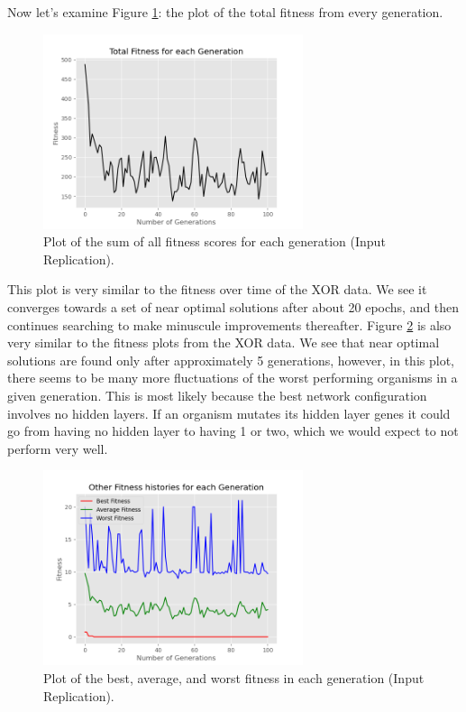 \documentclass[12pt]{report}
\begin{document}
Now let's examine Figure \ref{replicationtotal}: the plot of the total fitness from every generation.
 \begin{figure}[hbt!]
    \centering
    \includegraphics[width=3in]{figures/21.png}
    \caption{Plot of the sum of all fitness scores for each generation (Input Replication).}
    \label{replicationtotal}
\end{figure}
This plot is very similar to the fitness over time of the XOR data. We see it converges towards a set of near optimal solutions after about 20 epochs, and then continues searching to make minuscule improvements thereafter. Figure \ref{replicationfitness} is also very similar to the fitness plots from the XOR data. We see that near optimal solutions are found only after approximately 5 generations, however, in this plot, there seems to be many more fluctuations of the worst performing organisms in a given generation. This is most likely because the best network configuration involves no hidden layers.
If an organism mutates its hidden layer genes it could go from having no hidden layer to having 1 or two, which we would expect to not perform very well.
\begin{figure}[hbt!]
    \centering
    \includegraphics[width=3in]{figures/22.png}
    \caption{Plot of the best, average, and worst fitness in each generation (Input Replication).}
    \label{replicationfitness}
\end{figure}
\end{document}
